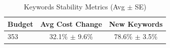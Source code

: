 \begin{table}[htbp]
\centering
\caption{Keywords Stability Metrics (Avg $\pm$ SE)}
\begin{tabular}{lcc}
\toprule
Budget & Avg Cost Change & New Keywords \\
\midrule
353 & 32.1\% $\pm$ 9.6\% & 78.6\% $\pm$ 3.5\% \\
\bottomrule
\end{tabular}
\end{table}